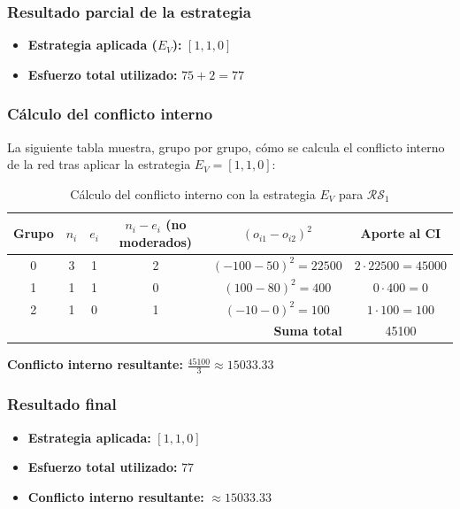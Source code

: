 \documentclass[11pt,letter]{article}
\begin{document}
\subsubsection*{Resultado parcial de la estrategia}

\begin{itemize}
    \item \textbf{Estrategia aplicada ($E_V$): } $[1, 1, 0]$
    \item \textbf{Esfuerzo total utilizado:} $75 + 2 = 77$
\end{itemize}

\subsubsection*{Cálculo del conflicto interno}

La siguiente tabla muestra, grupo por grupo, cómo se calcula el conflicto interno de la red tras aplicar la estrategia $E_V = [1, 1, 0]$:

\begin{table}[H]
\centering
\begin{tabular}{c|c|c|c|c|c}
\textbf{Grupo} & $n_i$ & $e_i$ & $n_i - e_i$ (no moderados) & $(o_{i1} - o_{i2})^2$ & Aporte al CI \\
\hline
0 & 3 & 1 & 2 & $(-100 - 50)^2 = 22500$ & $2 \cdot 22500 = 45000$ \\
1 & 1 & 1 & 0 & $(100 - 80)^2 = 400$ & $0 \cdot 400 = 0$ \\
2 & 1 & 0 & 1 & $(-10 - 0)^2 = 100$ & $1 \cdot 100 = 100$ \\
\hline
\multicolumn{5}{r|}{\textbf{Suma total}} & 45100 \\
\end{tabular}
\caption{Cálculo del conflicto interno con la estrategia $E_V$ para $\mathcal{RS}_1$}
\end{table}

\textbf{Conflicto interno resultante:} $\frac{45100}{3} \approx 15033.33$

\subsubsection*{Resultado final}

\begin{itemize}
    \item \textbf{Estrategia aplicada:} $[1, 1, 0]$
    \item \textbf{Esfuerzo total utilizado:} $77$
    \item \textbf{Conflicto interno resultante:} $\approx 15033.33$
\end{itemize}
\end{document}
